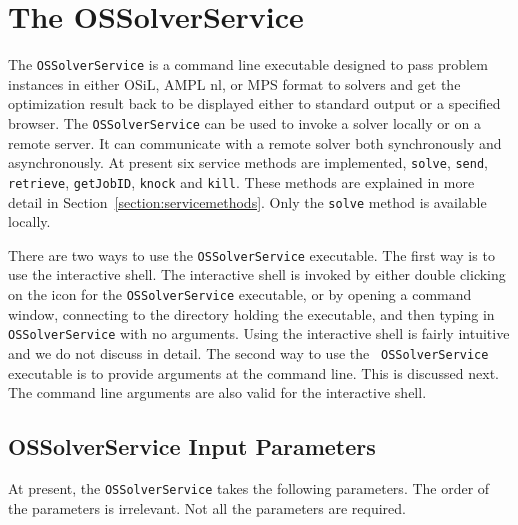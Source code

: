 
\section{The OSSolverService}\label{section:ossolverservice}

The {\tt OSSolverService} is a command line executable designed
to pass problem instances in either  OSiL, AMPL nl, or MPS format
to solvers and get the optimization result back to be displayed either to standard output or a specified browser.
The {\tt OSSolverService} can be used to invoke a solver locally or on a remote server. It can communicate with a remote solver both synchronously and asynchronously.
At present six service methods are implemented, 
{\tt solve},
{\tt send}, 
{\tt retrieve},
{\tt getJobID}, 
{\tt knock} and 
{\tt kill}.
These methods are explained in more detail in Section~\ref{section:servicemethods}. Only the {\tt solve} method is available locally. 

There are two ways  to use the {\tt OSSolverService} executable. The first way
is to use the interactive shell. The interactive shell is invoked by either 
double clicking on the icon for the {\tt OSSolverService} executable, or by opening a command
window, connecting to the directory holding the executable, and then typing in
{\tt OSSolverService} with no arguments. Using the interactive shell is fairly
intuitive and we do not discuss in detail. The second way to use the {\tt
OSSolverService} executable is to provide arguments at the command line. This is
discussed next. The command line arguments are also valid for the interactive shell. 

\subsection{OSSolverService Input Parameters}\label{section:OSSolverServiceInputParameters}

At present, the {\tt OSSolverService} takes the following parameters. The order of the parameters is irrelevant.
Not all the parameters are required. 

